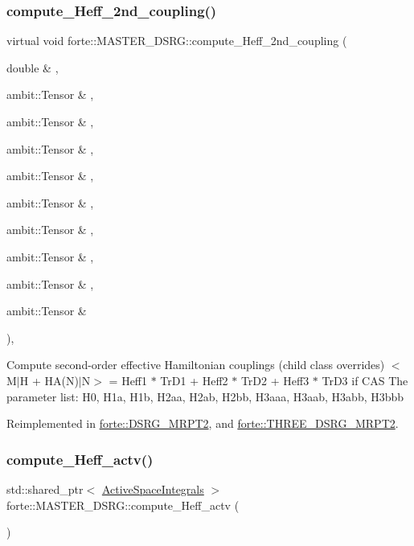 \subsubsection{\texorpdfstring{compute\+\_\+\+Heff\+\_\+2nd\+\_\+coupling()}{compute\_Heff\_2nd\_coupling()}}
{\footnotesize\ttfamily virtual void forte\+::\+M\+A\+S\+T\+E\+R\+\_\+\+D\+S\+R\+G\+::compute\+\_\+\+Heff\+\_\+2nd\+\_\+coupling (\begin{DoxyParamCaption}\item[{double \&}]{,  }\item[{ambit\+::\+Tensor \&}]{,  }\item[{ambit\+::\+Tensor \&}]{,  }\item[{ambit\+::\+Tensor \&}]{,  }\item[{ambit\+::\+Tensor \&}]{,  }\item[{ambit\+::\+Tensor \&}]{,  }\item[{ambit\+::\+Tensor \&}]{,  }\item[{ambit\+::\+Tensor \&}]{,  }\item[{ambit\+::\+Tensor \&}]{,  }\item[{ambit\+::\+Tensor \&}]{ }\end{DoxyParamCaption})\hspace{0.3cm}{\ttfamily [inline]}, {\ttfamily [virtual]}}

Compute second-\/order effective Hamiltonian couplings (child class overrides) $<$M$\vert$H + H\+A(\+N)$\vert$N$>$ = Heff1 $\ast$ Tr\+D1 + Heff2 $\ast$ Tr\+D2 + Heff3 $\ast$ Tr\+D3 if C\+AS The parameter list\+: H0, H1a, H1b, H2aa, H2ab, H2bb, H3aaa, H3aab, H3abb, H3bbb 

Reimplemented in \mbox{\hyperlink{classforte_1_1_d_s_r_g___m_r_p_t2_a739972fe0720c3a9881c1bd039fedb11}{forte\+::\+D\+S\+R\+G\+\_\+\+M\+R\+P\+T2}}, and \mbox{\hyperlink{classforte_1_1_t_h_r_e_e___d_s_r_g___m_r_p_t2_ad06666e1f7f43f146e32bee6fe9d4ab7}{forte\+::\+T\+H\+R\+E\+E\+\_\+\+D\+S\+R\+G\+\_\+\+M\+R\+P\+T2}}.

\mbox{\label{classforte_1_1_m_a_s_t_e_r___d_s_r_g_a4c4e581766abada72d8e1742a7887d2a}} 
\subsubsection{\texorpdfstring{compute\+\_\+\+Heff\+\_\+actv()}{compute\_Heff\_actv()}}
{\footnotesize\ttfamily std\+::shared\+\_\+ptr$<$ \mbox{\hyperlink{classforte_1_1_active_space_integrals}{Active\+Space\+Integrals}} $>$ forte\+::\+M\+A\+S\+T\+E\+R\+\_\+\+D\+S\+R\+G\+::compute\+\_\+\+Heff\+\_\+actv (\begin{DoxyParamCaption}{ }\end{DoxyParamCaption})\hspace{0.3cm}{\ttfamily [virtual]}}



